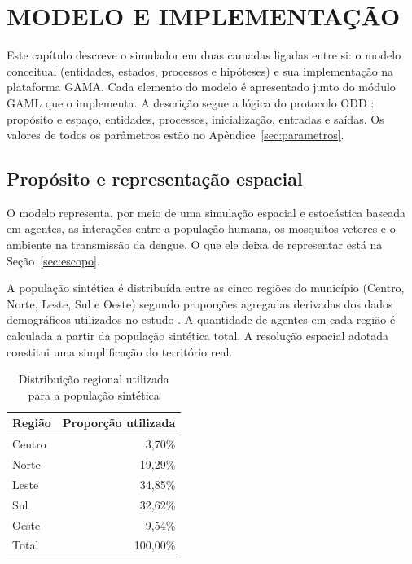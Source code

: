 \chapter{MODELO E IMPLEMENTAÇÃO}
\label{cap:modelo}

Este capítulo descreve o simulador em duas camadas ligadas entre si: o modelo conceitual (entidades, estados, processos e hipóteses) e sua implementação na plataforma GAMA. Cada elemento do modelo é apresentado junto do módulo GAML que o implementa. A descrição segue a lógica do protocolo ODD : propósito e espaço, entidades, processos, inicialização, entradas e saídas. Os valores de todos os parâmetros estão no Apêndice~\ref{sec:parametros}.

\section{Propósito e representação espacial}

O modelo representa, por meio de uma simulação espacial e estocástica baseada em agentes, as interações entre a população humana, os mosquitos vetores e o ambiente na transmissão da dengue. O que ele deixa de representar está na Seção~\ref{sec:escopo}.

A população sintética é distribuída entre as cinco regiões do município
(Centro, Norte, Leste, Sul e Oeste) segundo proporções agregadas derivadas
dos dados demográficos utilizados no estudo \cite{prefeitura_sp_2024_populacao}.
A quantidade de agentes em cada região é calculada a partir da população
sintética total. A resolução espacial adotada constitui uma simplificação
do território real.

\begin{table}[htb]
    \centering
    \caption{Distribuição regional utilizada para a população sintética}
    \label{tab:distribuicao-regional}
    \begin{tabular}{l r}
        \hline
        \textbf{Região} & \textbf{Proporção utilizada} \\
        \hline
        Centro & 3,70\% \\
        Norte  & 19,29\% \\
        Leste  & 34,85\% \\
        Sul    & 32,62\% \\
        Oeste  & 9,54\% \\
        \hline
        Total & 100,00\% \\
        \hline
    \end{tabular}
\end{table}
